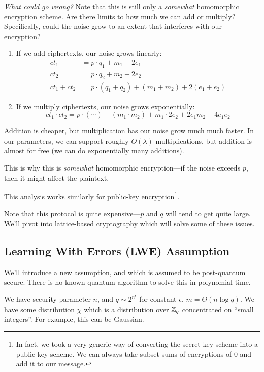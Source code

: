 \emph{What could go wrong?} Note that this is still only a \emph{somewhat} homomorphic encryption scheme. Are there limits to how much we can add or multiply? Specifically, could the noise grow to an extent that interferes with our encryption?
\begin{enumerate}
    \item If we add ciphertexts, our noise grows linearly:
          \begin{align*}
              ct_1        & = p\cdot q_1 + m_1 + 2e_1                         \\
              ct_2        & = p\cdot q_2 + m_2 + 2e_2                         \\
              ct_1 + ct_2 & = p\cdot (q_1 + q_2) + (m_1 + m_2) + 2(e_1 + e_2)
          \end{align*}
    \item If we multiply ciphertexts, our noise grows exponentially:
          \[ct_1 \cdot ct_2 = p\cdot (\cdots) + (m_1 \cdot m_2) + m_1\cdot 2e_2 + 2e_1m_2 + 4e_1e_2\]
\end{enumerate}
Addition is cheaper, but multiplication has our noise grow much much faster. In our parameters, we can support roughly $O(\lambda)$ multiplications, but addition is almost for free (we can do exponentially many additions).

This is why this is \emph{somewhat} homomorphic encryption---if the noise exceeds $p$, then it might affect the plaintext.

This analysis works similarly for public-key encryption\footnote{In fact, we took a very generic way of converting the secret-key scheme into a public-key scheme. We can always take subset sums of encryptions of $0$ and add it to our message.}.

Note that this protocol is quite expensive---$p$ and $q$ will tend to get quite large. We'll pivot into lattice-based cryptography which will solve some of these issues.

\subsection{Learning With Errors (LWE) Assumption}
We'll introduce a new assumption, and which is assumed to be post-quantum secure. There is no known quantum algorithm to solve this in polynomial time.

We have security parameter $n$, and $q\sim 2^{n^\epsilon}$ for constant $\epsilon$. $m = \Theta(n\log q)$. We have some distribution $\chi$ which is a distribution over $\mathbb Z_q$ concentrated on ``small integers''. For example, this can be Gaussian.

